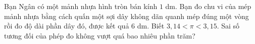 \begin{ex}
Bạn Ngân có một mảnh nhựa hình tròn bán kính $1$ dm. Bạn đo chu vi của mép mảnh nhựa bằng cách quấn một sợi dây không dãn quanh mép đúng một vòng rồi đo độ dài phần dây đó, được kết quả $6$ dm. Biết $3{,}14<\pi<3{,}15$. Sai số tương đối của phép đo không vượt quá bao nhiêu phần trăm?
\end{ex}
